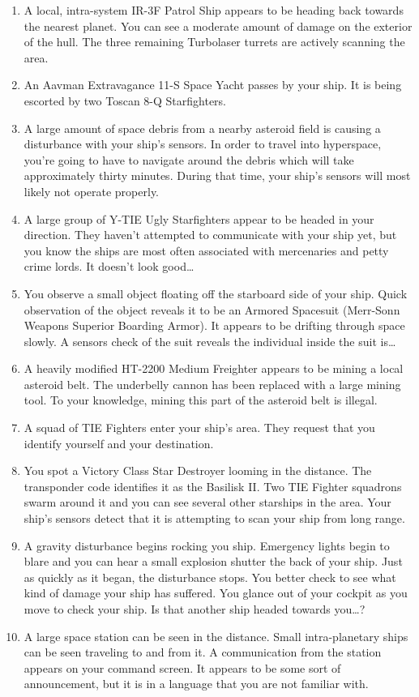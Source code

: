 \documentclass{article}
\begin{document}
\begin{enumerate}
	\item A local, intra-system IR-3F Patrol Ship appears to be heading back towards the nearest planet. You can see a moderate amount of damage on the exterior of the hull. The three remaining Turbolaser turrets are actively scanning the area.
	\item An Aavman Extravagance 11-S Space Yacht passes by your ship. It is being escorted by two Toscan 8-Q Starfighters.
	\item A large amount of space debris from a nearby asteroid field is causing a disturbance with your ship’s sensors. In order to travel into hyperspace, you’re going to have to navigate around the debris which will take approximately thirty minutes. During that time, your ship’s sensors will most likely not operate properly.
	\item A large group of Y-TIE Ugly Starfighters appear to be headed in your direction. They haven’t attempted to communicate with your ship yet, but you know the ships are most often associated with mercenaries and petty crime lords. It doesn’t look good…
	\item You observe a small object floating off the starboard side of your ship. Quick observation of the object reveals it to be an Armored Spacesuit (Merr-Sonn Weapons Superior Boarding Armor). It appears to be drifting through space slowly. A sensors check of the suit reveals the individual inside the suit is…
	\item A heavily modified HT-2200 Medium Freighter appears to be mining a local asteroid belt. The underbelly cannon has been replaced with a large mining tool. To your knowledge, mining this part of the asteroid belt is illegal.
	\item A squad of TIE Fighters enter your ship’s area. They request that you identify yourself and your destination.
	\item You spot a Victory Class Star Destroyer looming in the distance. The transponder code identifies it as the Basilisk II. Two TIE Fighter squadrons swarm around it and you can see several other starships in the area. Your ship’s sensors detect that it is attempting to scan your ship from long range.
	\item A gravity disturbance begins rocking you ship. Emergency lights begin to blare and you can hear a small explosion shutter the back of your ship. Just as quickly as it began, the disturbance stops. You better check to see what kind of damage your ship has suffered. You glance out of your cockpit as you move to check your ship. Is that another ship headed towards you…?
	\item A large space station can be seen in the distance. Small intra-planetary ships can be seen traveling to and from it. A communication from the station appears on your command screen. It appears to be some sort of announcement, but it is in a language that you are not familiar with.
\end{enumerate}
\end{document}
